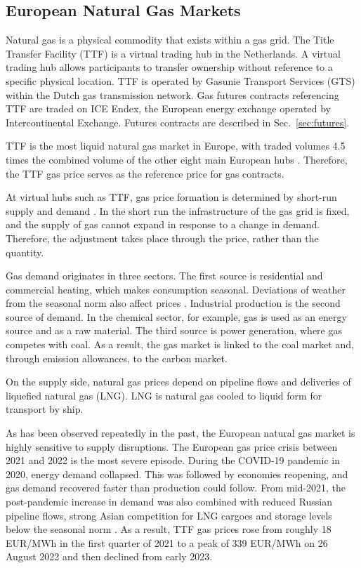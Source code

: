 \subsection{European Natural Gas Markets}\label{sec:gas-markets}
Natural gas is a physical commodity that exists within a gas grid. The Title Transfer Facility (TTF) is a virtual trading hub in the Netherlands. A virtual trading hub allows participants to transfer ownership without reference to a specific physical location. TTF is operated by Gasunie Transport Services (GTS) within the Dutch gas transmission network.  Gas futures contracts referencing TTF are traded on ICE Endex, the European energy exchange operated by Intercontinental Exchange. Futures contracts are described in Sec.~\ref{sec:futures}.

TTF is the most liquid natural gas market in Europe, with traded volumes 4.5 times the combined volume of the other eight main European hubs \parencite{heatherEuropeanTradedGas2026}. Therefore, the TTF gas price serves as the reference price for gas contracts. 

At virtual hubs such as TTF, gas price formation is determined by short-run supply and demand \parencite{obadiDRIVINGFUNDAMENTALSNATURAL2020}. In the short run the infrastructure of the gas grid is fixed, and the supply of gas cannot expand in response to a change in demand. Therefore, the adjustment takes place through the price, rather than the quantity.

Gas demand originates in three sectors. The first source is residential and commercial heating, which makes consumption seasonal.
Deviations of weather from the seasonal norm also affect prices \parencite{brownWhatDrivesNatural2008}. Industrial production is the second source of demand. In the chemical sector, for example, gas is used as an energy source and as a raw material. The third source is power generation, where gas competes with coal. As a result, the gas market is linked to the coal market and, through emission allowances, to the carbon market.

On the supply side, natural gas prices depend on pipeline flows and deliveries of liquefied natural gas (LNG). LNG is natural gas cooled to liquid form for transport by ship. 

As has been observed repeatedly in the past, the European natural gas market is highly sensitive to supply disruptions. The European gas price crisis between 2021 and 2022 is the most severe episode. During the COVID-19 pandemic in 2020, energy demand collapsed. This was followed by economies reopening, and gas demand recovered faster than production could follow. From mid-2021, the post-pandemic increase in demand was also combined with reduced Russian pipeline flows, strong Asian competition for LNG cargoes and storage levels below the seasonal norm \parencite{heather2022unfortunate}. As a result, TTF gas prices rose from roughly 18 EUR/MWh in the first quarter of 2021 to a peak of 339 EUR/MWh on 26 August 2022 and then declined from early 2023. 

